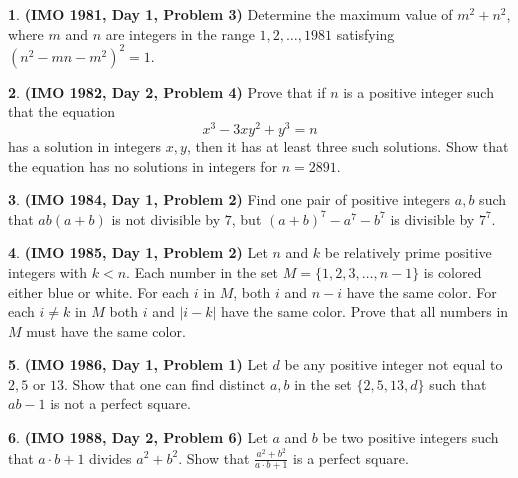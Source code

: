 \documentclass{article}
\newcommand{\plus}{+}
\theoremstyle{definition}
\newtheorem{p}{}
\begin{document}
\begin{p}{\bf (IMO 1981, Day 1, Problem 3)}
Determine the maximum value of $m^2+n^2$, where $m$ and $n$ are integers in the range $1,2,\ldots,1981$ satisfying $(n^2-mn-m^2)^2=1$.
\end{p}



\begin{p}{\bf (IMO 1982, Day 2, Problem 4)}
Prove that if $n$ is a positive integer such that the equation \[ x^3-3xy^2+y^3=n \] has a solution in integers $x,y$, then it has at least three such solutions. Show that the equation has no solutions in integers for $n=2891$.
\end{p}




\begin{p}{\bf (IMO 1984, Day 1, Problem 2)}
Find one pair of positive integers $a,b$ such that $ab(a+b)$ is not divisible by $7$, but $(a+b)^7-a^7-b^7$ is divisible by $7^7$.
\end{p}




\begin{p}{\bf (IMO 1985, Day 1, Problem 2)}
Let $n$ and $k$ be relatively prime positive integers with $k<n$. Each number in the set $M=\{1,2,3,\ldots,n-1\}$ is colored either blue or white. For each $i$ in $M$, both $i$ and $n-i$ have the same color. For each $i\ne k$ in $M$ both $i$ and $|i-k|$ have the same color. Prove that all numbers in $M$ must have the same color.
\end{p}







\begin{p}{\bf (IMO 1986, Day 1, Problem 1)}
Let $d$ be any positive integer not equal to $2, 5$ or $13$. Show that one can find distinct $a,b$ in the set $\{2,5,13,d\}$ such that $ab-1$ is not a perfect square.
\end{p}



\begin{p}{\bf (IMO 1988, Day 2, Problem 6)}
Let $ a$ and $ b$ be two positive integers such that $ a \cdot b \plus{} 1$ divides $ a^{2} \plus{} b^{2}$. Show that $ \frac {a^{2} \plus{} b^{2}}{a \cdot b \plus{} 1}$ is a perfect square.
\end{p}
\end{document}

